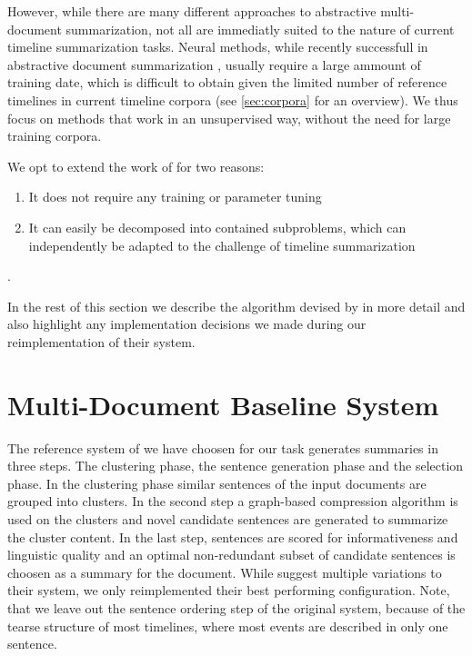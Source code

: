 \documentclass[a4paper,BCOR=10mm]{report}
\numberwithin{lemma}{chapter}
\numberwithin{definition}{chapter}
\begin{document}
However, while there are many different approaches to abstractive multi-document summarization, not all are immediatly suited to the nature of current timeline summarization tasks. Neural methods, while recently successfull in abstractive document summarization \citep{paulus}, usually require a large ammount of training date, which is difficult to obtain given the limited number of reference timelines in current timeline corpora (see \ref{sec:corpora} for an overview).
We thus focus on methods that work in an unsupervised way, without the need for large training corpora.

We opt to extend the work of \citep{banerjee} for two reasons:

\begin{enumerate}
\item{It does not require any training or parameter tuning}
\item{It can easily be decomposed into contained subproblems, which can independently be adapted to the challenge of timeline summarization}
\end{enumerate}.

In the rest of this section we describe the algorithm devised by \citet{banerjee} in more detail and also highlight any implementation decisions we made during our reimplementation of their system.

\section{Multi-Document Baseline System} \label{sec:mds-baseline}

The reference system of \citet{banerjee} we have choosen for our task generates summaries in three steps. The clustering phase, the sentence generation phase and the selection phase. In the clustering phase similar sentences of the input documents are grouped into clusters. In the second step a graph-based compression algorithm is used on the clusters and novel candidate sentences are generated to summarize the cluster content. In the last step, sentences are scored for informativeness and linguistic quality and an optimal non-redundant subset of candidate sentences is choosen as a summary for the document.
While \citeauthor{banerjee} suggest multiple variations to their system, we only reimplemented their best performing configuration. Note, that we leave out the sentence ordering step of the original system, because of the tearse structure of most timelines, where most events are described in only one sentence.
\end{document}
